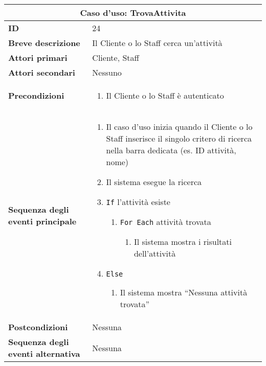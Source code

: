 \documentclass[a4paper]{report}
\begin{document}
\clearpage
\begin{table}[H]
\vspace*{-0cm}
\renewcommand{\arraystretch}{1.9}
\begin{tabular}{|p{3.9cm}|p{9.9cm}|}
\hline
\multicolumn{2}{|c|}{\textbf{Caso d’uso: TrovaAttivita}} \\ \hline
	\textbf{ID} & 24 \\ \hline
	\textbf{Breve descrizione} & Il Cliente o lo Staff cerca un’attività \\ \hline
	\textbf{Attori primari} & Cliente, Staff \\ \hline
	\textbf{Attori secondari} & Nessuno \\ \hline
	\textbf{Precondizioni} & \begin{enumerate}[leftmargin=14pt,label=\arabic*.,labelsep=0.5em,topsep=0pt,partopsep=0pt,parsep=0pt,itemsep=0pt]
    \item Il Cliente o lo Staff è autenticato
\end{enumerate} \\ \hline
	\textbf{Sequenza degli eventi principale} & \begin{enumerate}[leftmargin=14pt,label=\arabic*.,labelsep=0.5em,topsep=0pt,partopsep=0pt,parsep=0pt,itemsep=0pt]
    \item Il caso d’uso inizia quando il Cliente o lo Staff inserisce il singolo critero di ricerca nella barra dedicata (es. ID attività, nome)
    \item Il sistema esegue la ricerca
    \item \texttt{If} l’attività esiste
    \begin{enumerate}[label=\arabic{enumi}.\arabic*.,leftmargin=22pt,labelsep=0.5em,topsep=0pt,partopsep=0pt,parsep=0pt,itemsep=0pt]
        \item \texttt{For Each} attività trovata
        \begin{enumerate}[label=\arabic{enumi}.\arabic{enumii}.\arabic*.,leftmargin=22pt,labelsep=0.5em,topsep=0pt,partopsep=0pt,parsep=0pt,itemsep=0pt]
            \item Il sistema mostra i risultati dell'attività
        \end{enumerate}
    \end{enumerate}
    \item \texttt{Else}
    \begin{enumerate}[label=\arabic{enumi}.\arabic*.,leftmargin=22pt,labelsep=0.5em,topsep=0pt,partopsep=0pt,parsep=0pt,itemsep=0pt]
        \item Il sistema mostra “Nessuna attività trovata”
    \end{enumerate}
\end{enumerate} \\ \hline
	\textbf{Postcondizioni} & Nessuna \\ \hline
	\textbf{Sequenza degli eventi alternativa} & Nessuna \\ \hline
\end{tabular}
\end{table}
\end{document}
